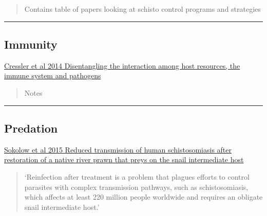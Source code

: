 \documentclass[10,portrait]{article}
\begin{document}
\begin{quote}
Contains table of papers looking at schisto control programs and
strategies
\end{quote}

\newpage  

\begin{center}\rule{0.5\linewidth}{\linethickness}\end{center}

\subsection{Immunity}\label{immunity}

\href{https://onlinelibrary.wiley.com/doi/pdf/10.1111/ele.12229}{Cressler
et al 2014 Disentangling the interaction among host resources, the
immune system and pathogens}

\begin{quote}
Notes
\end{quote}

\newpage  

\begin{center}\rule{0.5\linewidth}{\linethickness}\end{center}

\subsection{Predation}\label{predation}

\href{http://www.pnas.org/content/pnas/early/2015/07/15/1502651112.full.pdf}{Sokolow
et al 2015 Reduced transmission of human schistosomiasis after
restoration of a native river prawn that preys on the snail intermediate
host}

\begin{quote}
`Reinfection after treatment is a problem that plagues efforts to
control parasites with complex transmission pathways, such as
schistosomiasis, which affects at least 220 million people worldwide and
requires an obligate snail intermediate host.'
\end{quote}

\begin{quote}
\end{quote}

\printbibliography
\end{document}
